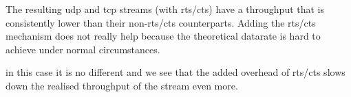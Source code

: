 The resulting udp and tcp streams (with rts/cts) have a throughput that is consistently lower than their non-rts/cts counterparts. Adding the rts/cts mechanism does not really help because the theoretical datarate is hard to achieve under normal circumstances. 

in this case it is no different and we see that the added overhead of rts/cts slows down the realised throughput of the stream even more.
